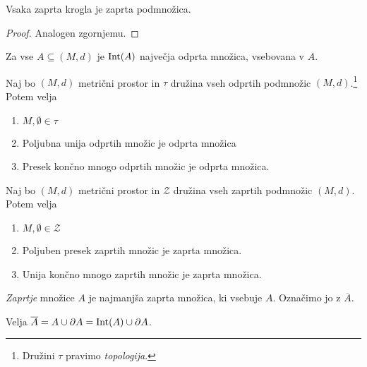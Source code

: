 \documentclass[12pt, a4paper]{article}
\begin{document}
\begin{trditev}
Vsaka zaprta krogla je zaprta podmnožica.
\end{trditev}

\begin{proof}
Analogen zgornjemu.
\end{proof}

\begin{opomba}
Za vse $A\subseteq(M,d)$ je $\operatorname{Int}(A)$ največja odprta množica, vsebovana v $A$.
\end{opomba}

\begin{izrek}[Topologija]
Naj bo $(M,d)$ metrični prostor in $\tau$ družina vseh odprtih podmnožic $(M,d)$.\footnote{Družini $\tau$ pravimo \emph{topologija}.} Potem velja

\begin{enumerate}[label=\roman*)]
\item $M,\emptyset\in\tau$
\item Poljubna unija odprtih množic je odprta množica
\item Presek končno mnogo odprtih množic je odprta množica.
\end{enumerate}
\end{izrek}

\obvs

\begin{posledica}
Naj bo $(M,d)$ metrični prostor in $\mathcal{Z}$ družina vseh zaprtih podmnožic $(M,d)$. Potem velja

\begin{enumerate}[label=\roman*)]
\item $M,\emptyset\in\mathcal{Z}$
\item Poljuben presek zaprtih množic je zaprta množica.
\item Unija končno mnogo zaprtih množic je zaprta množica.
\end{enumerate}
\end{posledica}

\obvs

\begin{definicija}
\emph{Zaprtje} množice $A$ je najmanjša zaprta množica, ki vsebuje $A$. Označimo jo z $\overline{A}$.
\end{definicija}

\begin{trditev}
Velja $\overline{A}=A\cup\partial A=\operatorname{Int}(A)\cup\partial A$.
\end{trditev}
\end{document}
